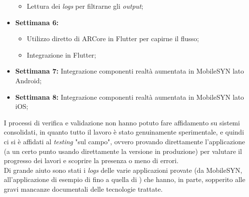 \begin{itemize}
\begin{itemize}
          \item Lettura dei \textit{logs} per filtrarne gli \textit{output};
      \end{itemize}
  \item \textbf{Settimana 6:} 
      \begin{itemize}
        \item Utilizzo diretto di ARCore in Flutter per capirne il flusso;
        \item Integrazione \asa{} in Flutter;
      \end{itemize}
  \item \textbf{Settimana 7:} Integrazione componenti realtà aumentata in MobileSYN lato Android;
  \item \textbf{Settimana 8:} Integrazione componenti realtà aumentata in MobileSYN lato iOS;
\end{itemize}

I processi di verifica e validazione non hanno potuto fare affidamento su sistemi consolidati, in quanto tutto il lavoro è stato genuinamente sperimentale, e quindi ci si è affidati al \textit{testing} "sul campo", ovvero provando direttamente l'applicazione (a un certo punto usando direttamente la versione in produzione) per valutare il progresso dei lavori e scoprire la presenza o meno di errori.\\
Di grande aiuto sono stati i \textit{logs} delle varie applicazioni provate (da MobileSYN, all'applicazione di esempio di \aplug{} fino a quella di \asa{}) che hanno, in parte, sopperito alle gravi mancanze documentali delle tecnologie trattate.


